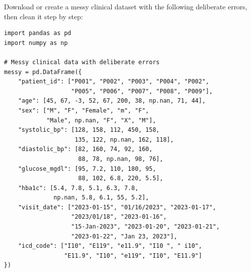 \begin{exercise}
Download or create a messy clinical dataset with the following deliberate errors, then clean it step by step:

\begin{verbatim}
import pandas as pd
import numpy as np

# Messy clinical data with deliberate errors
messy = pd.DataFrame({
    "patient_id": ["P001", "P002", "P003", "P004", "P002",
                   "P005", "P006", "P007", "P008", "P009"],
    "age": [45, 67, -3, 52, 67, 200, 38, np.nan, 71, 44],
    "sex": ["M", "F", "Female", "m", "F",
            "Male", np.nan, "F", "X", "M"],
    "systolic_bp": [128, 158, 112, 450, 158,
                    135, 122, np.nan, 162, 118],
    "diastolic_bp": [82, 160, 74, 92, 160,
                     88, 78, np.nan, 98, 76],
    "glucose_mgdl": [95, 7.2, 110, 180, 95,
                     88, 102, 6.8, 220, 5.5],
    "hba1c": [5.4, 7.8, 5.1, 6.3, 7.8,
              np.nan, 5.8, 6.1, 55, 5.2],
    "visit_date": ["2023-01-15", "01/16/2023", "2023-01-17",
                   "2023/01/18", "2023-01-16",
                   "15-Jan-2023", "2023-01-20", "2023-01-21",
                   "2023-01-22", "Jan 23, 2023"],
    "icd_code": ["I10", "E119", "e11.9", "I10 ", " i10",
                 "E11.9", "I10", "e119", "I10", "E11.9"]
})
\end{verbatim}


\end{exercise}
